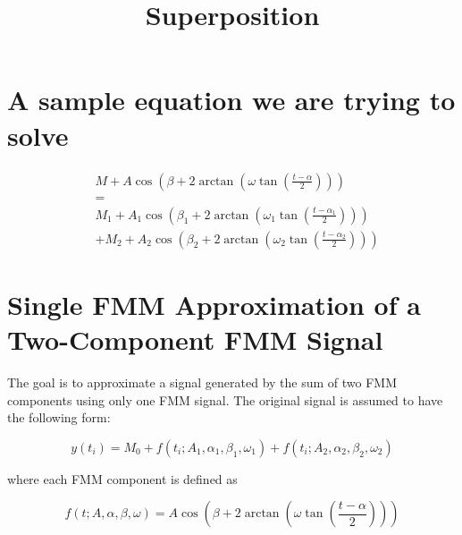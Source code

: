 \documentclass[a4paper]{article}
\title{Superposition}
\date{}
\begin{document}
    \maketitle
    
    
    \section{A sample equation we are trying to solve}
        \[
            \begin{aligned}
                &M
                +
                A\cos\left(
                         \beta
                         +
                         2\arctan\left(
                                     \omega\tan\left(\frac{t-\alpha}{2}\right)
                    \right)
                \right)
                \\
                &=
                \\
                &M_1
                +
                A_1\cos\left(
                           \beta_1
                    +
                    2\arctan\left(
                                \omega_1\tan\left(\frac{t-\alpha_1}{2}\right)
                    \right)
                \right)
                \\
                &+
                M_2
                +
                A_2\cos\left(
                           \beta_2
                    +
                    2\arctan\left(
                                \omega_2\tan\left(\frac{t-\alpha_2}{2}\right)
                    \right)
                \right)
            \end{aligned}
        \]
    
    
    \section{Single FMM Approximation of a Two-Component FMM Signal}
        
        The goal is to approximate a signal generated by the sum of two FMM components using only one FMM signal. The original signal is assumed to have the following form:
        
        \[
            y(t_i)
            =
            M_0
            +
            f(t_i; A_1,\alpha_1,\beta_1,\omega_1)
            +
            f(t_i; A_2,\alpha_2,\beta_2,\omega_2)
        \]
        
        where each FMM component is defined as
        
        \[
            f(t; A,\alpha,\beta,\omega)
            =
            A
            \cos
            \left(
                \beta
                +
                2
                \arctan
                \left(
                    \omega
                    \tan
                    \left(
                        \frac{t-\alpha}{2}
                    \right)
                \right)
            \right)
        \]
        
\end{document}
